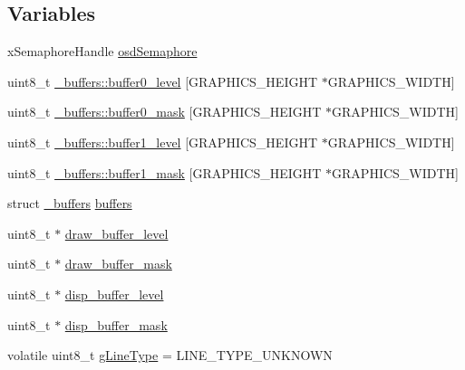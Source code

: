 \subsection*{\-Variables}
\begin{DoxyCompactItemize}
\item 
x\-Semaphore\-Handle \hyperlink{group___p_i_o_s___v_i_d_e_o_ga34f96a89a1ad6c4649787dbc18e218e5}{osd\-Semaphore}
\item 
uint8\-\_\-t \hyperlink{group___p_i_o_s___v_i_d_e_o_ga3b52f2bd3c15f12d7a7257c5d8ff2627}{\-\_\-buffers\-::buffer0\-\_\-level} \mbox{[}\-G\-R\-A\-P\-H\-I\-C\-S\-\_\-\-H\-E\-I\-G\-H\-T $\ast$\-G\-R\-A\-P\-H\-I\-C\-S\-\_\-\-W\-I\-D\-T\-H\mbox{]}
\item 
uint8\-\_\-t \hyperlink{group___p_i_o_s___v_i_d_e_o_ga9620d63e32309e41277c6dd2dc8ee2ae}{\-\_\-buffers\-::buffer0\-\_\-mask} \mbox{[}\-G\-R\-A\-P\-H\-I\-C\-S\-\_\-\-H\-E\-I\-G\-H\-T $\ast$\-G\-R\-A\-P\-H\-I\-C\-S\-\_\-\-W\-I\-D\-T\-H\mbox{]}
\item 
uint8\-\_\-t \hyperlink{group___p_i_o_s___v_i_d_e_o_ga63add1136b802684b982c920c01ae697}{\-\_\-buffers\-::buffer1\-\_\-level} \mbox{[}\-G\-R\-A\-P\-H\-I\-C\-S\-\_\-\-H\-E\-I\-G\-H\-T $\ast$\-G\-R\-A\-P\-H\-I\-C\-S\-\_\-\-W\-I\-D\-T\-H\mbox{]}
\item 
uint8\-\_\-t \hyperlink{group___p_i_o_s___v_i_d_e_o_gad0338825ac9f4f66d1f1cc5147b69aa7}{\-\_\-buffers\-::buffer1\-\_\-mask} \mbox{[}\-G\-R\-A\-P\-H\-I\-C\-S\-\_\-\-H\-E\-I\-G\-H\-T $\ast$\-G\-R\-A\-P\-H\-I\-C\-S\-\_\-\-W\-I\-D\-T\-H\mbox{]}
\item 
struct \hyperlink{struct__buffers}{\-\_\-buffers} \hyperlink{group___p_i_o_s___v_i_d_e_o_gaec9bffb1068ac55e742a1e7b6e449273}{buffers}
\item 
uint8\-\_\-t $\ast$ \hyperlink{group___p_i_o_s___v_i_d_e_o_ga52b5c0fc86a398ddf62c5b2bb383374d}{draw\-\_\-buffer\-\_\-level}
\item 
uint8\-\_\-t $\ast$ \hyperlink{group___p_i_o_s___v_i_d_e_o_ga67085db0125b910109083e4d2605d7d5}{draw\-\_\-buffer\-\_\-mask}
\item 
uint8\-\_\-t $\ast$ \hyperlink{group___p_i_o_s___v_i_d_e_o_gac6ace302511130c48032b40f32a40bb8}{disp\-\_\-buffer\-\_\-level}
\item 
uint8\-\_\-t $\ast$ \hyperlink{group___p_i_o_s___v_i_d_e_o_ga2de64a6d3102b302a9b7582d63f09485}{disp\-\_\-buffer\-\_\-mask}
\item 
volatile uint8\-\_\-t \hyperlink{group___p_i_o_s___v_i_d_e_o_ga2be6bb035ef820488def868f5165b836}{g\-Line\-Type} = \-L\-I\-N\-E\-\_\-\-T\-Y\-P\-E\-\_\-\-U\-N\-K\-N\-O\-W\-N

\end{DoxyCompactItemize}
